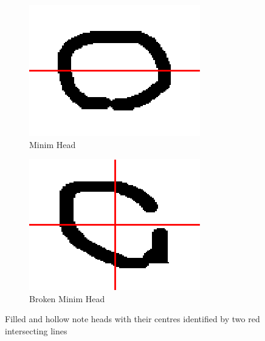 \begin{figure}[H]
    \begin{subfigure}[b]{.3\linewidth}
        \centering
        \includegraphics[width=\linewidth]{gfx/techniques/scoring/note-head/1818-centroid-centre.png}
        \caption{Minim Head}
    \end{subfigure}
    \begin{subfigure}[b]{.3\linewidth}
        \centering
        \includegraphics[width=\linewidth]{gfx/techniques/scoring/note-head/6105-centroid-centre.png}
        \caption{Broken Minim Head}
    \end{subfigure}

  \caption{Filled and hollow note heads with their centres identified by two red intersecting lines}
  \label{fig:ccl-two-pass}
\end{figure}

